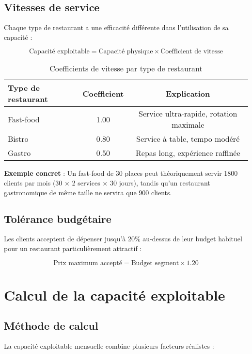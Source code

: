 \documentclass[12pt,a4paper]{article}
\begin{document}
\subsection{Vitesses de service}

Chaque type de restaurant a une efficacité différente dans l'utilisation de sa capacité :

$$\text{Capacité exploitable} = \text{Capacité physique} \times \text{Coefficient de vitesse}$$

\begin{table}[H]
\centering
\begin{tabular}{lcc}
\toprule
Type de restaurant & Coefficient & Explication \\
\midrule
Fast-food & 1.00 & Service ultra-rapide, rotation maximale \\
Bistro & 0.80 & Service à table, tempo modéré \\
Gastro & 0.50 & Repas long, expérience raffinée \\
\bottomrule
\end{tabular}
\caption{Coefficients de vitesse par type de restaurant}
\end{table}

\textbf{Exemple concret} : Un fast-food de 30 places peut théoriquement servir 1800 clients par mois (30 × 2 services × 30 jours), tandis qu'un restaurant gastronomique de même taille ne servira que 900 clients.

\subsection{Tolérance budgétaire}

Les clients acceptent de dépenser jusqu'à 20\% au-dessus de leur budget habituel pour un restaurant particulièrement attractif :

$$\text{Prix maximum accepté} = \text{Budget segment} \times 1.20$$

\section{Calcul de la capacité exploitable}

\subsection{Méthode de calcul}

La capacité exploitable mensuelle combine plusieurs facteurs réalistes :
\end{document}
